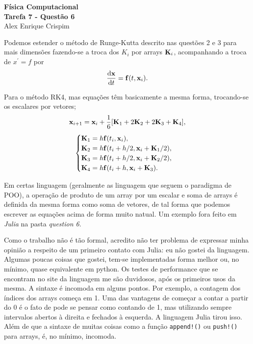 


  \begin{center}
    \LARGE \textbf{Física Computacional} \\
    \Large \textbf{Tarefa 7 - Questão 6} \\
    \large Alex Enrique Crispim
  \end{center}

  Podemos estender o método de Runge-Kutta descrito nas questões 2 e 3 para mais dimensões fazendo-se a troca dos $K_i$ por arrays $\vb{K}_i$, acompanhando a troca de $x^\prime = f$ por
  \begin{equation*}
    \dv{\vb{x}}{t} = \vb{f}(t, \vb{x}_i).
  \end{equation*}

  Para o método RK4, mas equações têm basicamente a mesma forma, trocando-se os escalares por vetores;
  \begin{equation}
    \vb{x}_{i+1} = \vb{x}_i + \frac{1}{6} \qty[\vb{K}_1 + 2 \vb{K}_2 + 2\vb{K}_3 + \vb{K}_4],
  \end{equation}
  \begin{equation*}
    \begin{cases}
      \vb{K}_1 = h \vb{f}(t_i, \vb{x}_i), \\
      \vb{K}_2 = h \vb{f}(t_i + h/2, \vb{x}_i + \vb{K}_1 / 2), \\
      \vb{K}_3 = h \vb{f}(t_i + h/2, \vb{x}_i + \vb{K}_2 / 2), \\
      \vb{K}_4 = h \vb{f}(t_i + h, \vb{x}_i + \vb{K}_3).
    \end{cases}
  \end{equation*}

  Em certas linguagem (geralmente as linguagem que seguem o paradigma de POO), a operação de produto de um array por um escalar e soma de arrays é definida da mesma forma como soma de vetores, de tal forma que podemos escrever as equações acima de forma muito natual. Um exemplo fora feito em \textit{Julia} na pasta \textit{question 6}.

  Como o trabalho não é tão formal, acredito não ter problema de expressar minha opinião a respeito de um primeiro contato com Julia: eu não gostei da linguagem. Algumas poucas coisas que gostei, tem-se implementadas forma melhor ou, no mínimo, quase equivalente em python. Os testes de performance que se encontram no site da linguagem me são duvidosos, após os primeiros usos da mesma. A sintaxe é incomoda em alguns pontos. Por exemplo, a contagem dos índices dos arrays começa em 1. Uma das vantagens de começar a contar a partir do 0 é o fato de pode se pensar como contando de 1, mas utilizando sempre intervalos abertos à direita e fechados à esquerda. A linguagem Julia tirou isso. Além de que a sintaxe de muitas coisas como a função \texttt{append!()} ou \texttt{push!()} para arrays, é, no mínimo, incomoda.


